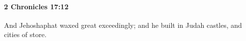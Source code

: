 
		\paragraph{2 Chronicles 17:12} %
			\label{2CHRONICLES-17-12}

			And Jehoshaphat waxed great exceedingly; and he built in Judah castles, and cities of store.



